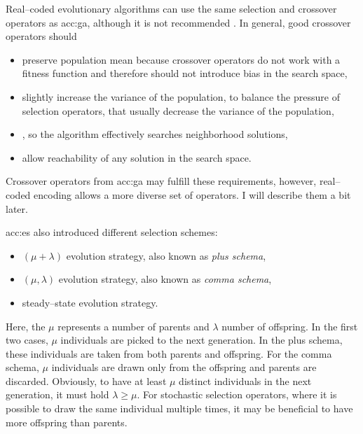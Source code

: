 Real--coded evolutionary algorithms can use the same selection and crossover operators as \acrshort{acc:ga}, although it is not recommended \citet{IntroductionToEA}. In general, good crossover operators should
\begin{itemize}
    \item preserve population mean because crossover operators do not work with a fitness function and therefore should not introduce bias in the search space,
    \item slightly increase the variance of the population, to balance the pressure of selection operators, that usually decrease the variance of the population,
    \item\label{enum:espopulationvariance} \snipescondition, so the algorithm effectively searches neighborhood solutions,
    \item allow reachability of any solution in the search space.
\end{itemize}
Crossover operators from \acrshort{acc:ga} may fulfill these requirements, however, real--coded encoding allows a more diverse set of operators. I will describe them a bit later.

\acrshort{acc:es} also introduced different selection schemes:
\begin{itemize}
    \item $\left(\mu+\lambda\right)$ evolution strategy, also known as \emph{plus schema},
    \item  $\left(\mu,\lambda\right)$ evolution strategy, also known as \emph{comma schema},
    \item\label{enum:steadystate} steady--state evolution strategy.
\end{itemize}
Here, the $\mu$ represents a number of parents and $\lambda$ number of offspring. In the first two cases, $\mu$ individuals are picked to the next generation. In the plus schema, these individuals are taken from both parents and offspring. For the comma schema, $\mu$ individuals are drawn only from the offspring and parents are discarded. Obviously, to have at least $\mu$ distinct individuals in the next generation, it must hold $\lambda\geq\mu$. For stochastic selection operators, where it is possible to draw the same individual multiple times, it may be beneficial to have more offspring than parents.

